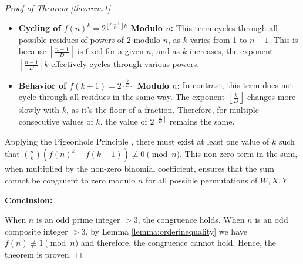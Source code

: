 \documentclass{article}
\theoremstyle{plain}
\theoremstyle{definition}
\begin{document}
\begin{proof}[Proof of Theorem \ref{theorem:1}]
\begin{itemize}
    \item \textbf{Cycling of \( f(n)^k = 2^{\left\lfloor \frac{n-1}{D} \right\rfloor k} \) Modulo \( n \):} This term cycles through all possible residues of powers of 2 modulo \( n \), as \( k \) varies from 1 to \( n-1 \). This is because \( \left\lfloor \frac{n-1}{D} \right\rfloor \) is fixed for a given \( n \), and as \( k \) increases, the exponent \( \left\lfloor \frac{n-1}{D} \right\rfloor k \) effectively cycles through various powers.
    \item \textbf{Behavior of \( f(k+1) = 2^{\left\lfloor \frac{k}{D} \right\rfloor} \) Modulo \( n \):} In contrast, this term does not cycle through all residues in the same way. The exponent \( \left\lfloor \frac{k}{D} \right\rfloor \) changes more slowly with \( k \), as it's the floor of a fraction. Therefore, for multiple consecutive values of \( k \), the value of \( 2^{\left\lfloor \frac{k}{D} \right\rfloor} \) remains the same.
\end{itemize}    

Applying the Pigeonhole Principle \cite{rosen2012}, there must exist at least one value of \( k \) such that \( \binom{n}{k} \left(f(n)^k - f(k+1)\right) \not\equiv 0 \pmod{n} \). This non-zero term in the sum, when multiplied by the non-zero binomial coefficient, ensures that the sum cannot be congruent to zero modulo \( n \) for all possible permutations of $W, X, Y$.

\textbf{Conclusion:}

When $n$ is an odd prime integer $>3$, the congruence holds. When $n$ is an odd composite integer $>3$, by Lemma \ref{lemma:orderinequality} we have $f(n) \not\equiv 1 \pmod{n}$ and therefore, the congruence cannot hold. Hence, the theorem is proven.
\end{proof}
\end{document}
